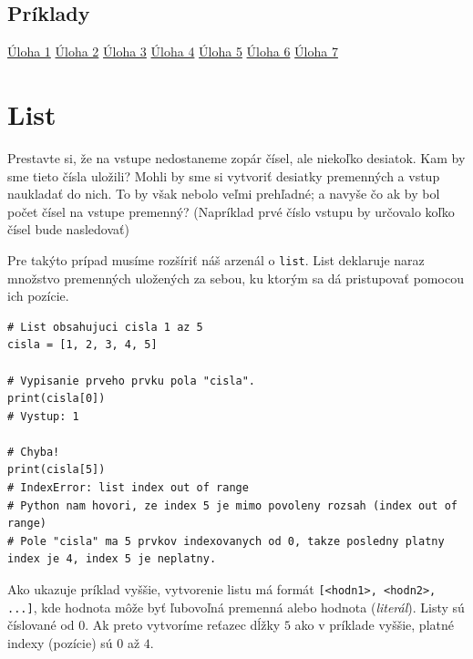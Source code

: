 \documentclass{article}
\begin{document}
\subsection{Príklady}
\href{https://testovac.ksp.sk/tasks/ls-uvod-cykly/}{Úloha 1}
\href{https://testovac.ksp.sk/tasks/ls-uvod-pasik/}{Úloha 2}
\href{https://testovac.ksp.sk/tasks/ls-uvod-obdlznik2/}{Úloha 3}
\href{https://testovac.ksp.sk/tasks/ls-uvod-trojuholnik/}{Úloha 4}
\href{https://testovac.ksp.sk/tasks/ls-uvod-pyramida/}{Úloha 5}
\href{https://testovac.ksp.sk/tasks/ls-uvod-najvacsi/}{Úloha 6}
\href{https://testovac.ksp.sk/tasks/ls-uvod-fibonacci/}{Úloha 7}

\section{List}

Prestavte si, že na vstupe nedostaneme zopár čísel, ale niekoľko desiatok. Kam by sme tieto čísla uložili? Mohli by sme si vytvoriť desiatky premenných a vstup naukladať do nich. To by však nebolo veľmi prehľadné; a navyše čo ak by bol počet čísel na vstupe premenný? (Napríklad prvé číslo vstupu by určovalo koľko čísel bude nasledovať)

Pre takýto prípad musíme rozšíriť náš arzenál o \texttt{list}. List deklaruje naraz množstvo premenných uložených za sebou, ku ktorým sa dá pristupovať pomocou ich pozície.
\begin{lstlisting}
# List obsahujuci cisla 1 az 5
cisla = [1, 2, 3, 4, 5]

# Vypisanie prveho prvku pola "cisla".
print(cisla[0])
# Vystup: 1

# Chyba!
print(cisla[5])
# IndexError: list index out of range
# Python nam hovori, ze index 5 je mimo povoleny rozsah (index out of range)
# Pole "cisla" ma 5 prvkov indexovanych od 0, takze posledny platny index je 4, index 5 je neplatny.
\end{lstlisting}

Ako ukazuje príklad vyššie, vytvorenie listu má formát \texttt{[<hodn1>, <hodn2>, ...]}, kde hodnota môže byť ľubovoľná premenná alebo hodnota (\textit{literál}). Listy sú číslované od $0$. Ak preto vytvoríme reťazec dĺžky $5$ ako v príklade vyššie, platné indexy (pozície) sú $0$ až $4$. 
\end{document}
